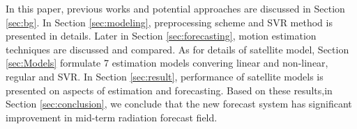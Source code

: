 \documentclass[conference]{IEEEtran}
\begin{document}
In this paper, previous works and potential approaches are discussed in
Section \ref{sec:bg}. In Section \ref{sec:modeling}, preprocessing scheme and
SVR method is presented in details. Later in Section \ref{sec:forecasting},
motion estimation techniques are discussed and compared. As for details
of satellite model, Section \ref{sec:Models} formulate 7 estimation models
convering linear and non-linear, regular and SVR. In Section \ref{sec:result},
performance of satellite models is presented on aspects of estimation and
forecasting. Based on these results,in Section \ref{sec:conclusion}, we conclude
that the new forecast system has significant improvement in
mid-term radiation forecast field.


% 
% 
% 
% 
\end{document}
